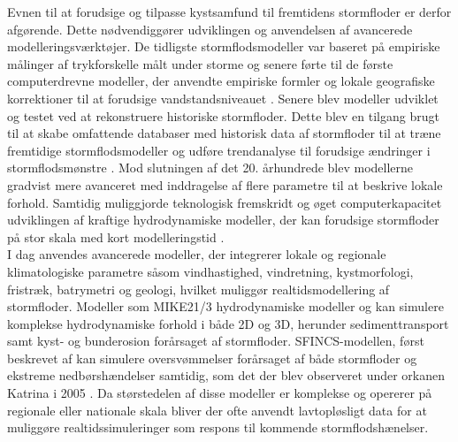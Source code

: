 Evnen til at forudsige og tilpasse kystsamfund til fremtidens stormfloder er derfor afgørende. Dette nødvendiggører udviklingen og anvendelsen af avancerede modelleringsværktøjer. De tidligste stormflodsmodeller var baseret på empiriske målinger af trykforskelle målt under storme og senere førte til de første computerdrevne modeller, der anvendte empiriske formler og lokale geografiske korrektioner til at forudsige vandstandsniveauet \citep{massey_history_2007}. Senere blev modeller udviklet og testet ved at rekonstruere historiske stormfloder. Dette blev en tilgang brugt til at skabe omfattende databaser med historisk data af stormfloder til at træne fremtidige stormflodsmodeller og udføre trendanalyse til forudsige ændringer i stormflodsmønstre \citep{tadesse_database_2021, dang_dataset_2024}. Mod slutningen af det 20. århundrede blev modellerne gradvist mere avanceret med inddragelse af flere parametre til at beskrive lokale forhold. Samtidig muliggjorde teknologisk fremskridt og øget computerkapacitet udviklingen af kraftige hydrodynamiske modeller, der kan forudsige stormfloder på stor skala med kort modelleringstid \citep{tadesse_database_2021, massey_history_2007}.\\
I dag anvendes avancerede modeller, der integrerer lokale og regionale klimatologiske parametre såsom vindhastighed, vindretning, kystmorfologi, fristræk, batrymetri og geologi, hvilket muliggør realtidsmodellering af stormfloder. Modeller som MIKE21/3 hydrodynamiske modeller \citep{dhi_mike_2024} og \cite{adcirc_introduction_nodate} kan simulere komplekse hydrodynamiske forhold i både 2D og 3D, herunder sedimenttransport samt kyst- og bunderosion forårsaget af stormfloder. SFINCS-modellen, først beskrevet af \cite{leijnse_modeling_2021} kan simulere oversvømmelser forårsaget af både stormfloder og ekstreme nedbørshændelser samtidig, som det der blev observeret under orkanen Katrina i 2005 \citep{reible_hurricane_2007}. Da størstedelen af disse modeller er komplekse og opererer på regionale eller nationale skala bliver der ofte anvendt lavtopløsligt data for at muliggøre realtidssimuleringer som respons til kommende stormflodshænelser.\\

